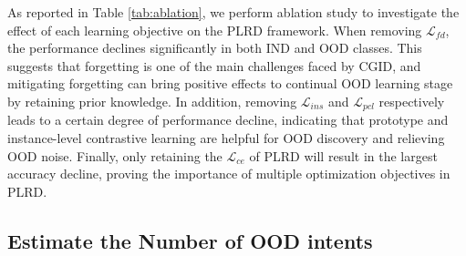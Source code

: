 \documentclass[11pt]{article}
\begin{document}
As reported in Table \ref{tab:ablation}, we perform ablation study to investigate the effect of each learning objective on the PLRD framework. When removing  $\mathcal{L}_{fd}$, the performance declines significantly in both IND and OOD classes. This suggests that forgetting is one of the main challenges faced by CGID, and mitigating forgetting can bring positive effects to continual OOD learning stage by retaining prior knowledge. In addition, removing $\mathcal{L}_{ins}$ and $\mathcal{L}_{pcl}$ respectively leads to a certain degree of performance decline, indicating that prototype and instance-level contrastive learning are helpful for OOD discovery and relieving OOD noise. Finally, only retaining the $\mathcal{L}_{ce}$ of PLRD will result in the largest accuracy decline, proving the importance of multiple optimization objectives in PLRD.



\subsection{Estimate the Number of OOD intents}
\label{app:estimate_k}

\begin{table}[t]
    \centering
{}
\caption{Estimate the number of new classes at each OOD learning stage under Banking OOD ratio = 60\%.}
\label{tab:predict_k}
\end{table}
\end{document}
